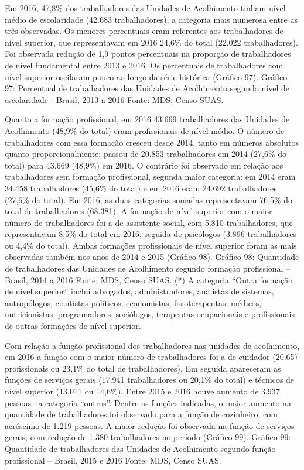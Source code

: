 \documentclass[
  brazilian]{report}
\begin{document}
Em 2016, 47,8\% dos trabalhadores das Unidades de Acolhimento tinham
nível médio de escolaridade (42.683 trabalhadores), a categoria mais
numerosa entre as três observadas. Os menores percentuais eram
referentes aos trabalhadores de nível superior, que representavam em
2016 24,6\% do total (22.022 trabalhadores). Foi observada redução de
1,9 pontos percentuais na proporção de trabalhadores de nível
fundamental entre 2013 e 2016. Os percentuais de trabalhadores com nível
superior oscilaram pouco ao longo da série histórica (Gráfico 97).
Gráfico 97: Percentual de trabalhadores das Unidades de Acolhimento
segundo nível de escolaridade - Brasil, 2013 a 2016 Fonte: MDS, Censo
SUAS.

Quanto a formação profissional, em 2016 43.669 trabalhadores das
Unidades de Acolhimento (48,9\% do total) eram profissionais de nível
médio. O número de trabalhadores com essa formação cresceu desde 2014,
tanto em números absolutos quanto proporcionalmente: passou de 20.853
trabalhadores em 2014 (27,6\% do total) para 43.669 (48,9\%) em 2016. O
contrário foi observado em relação aos trabalhadores sem formação
profissional, segunda maior categoria: em 2014 eram 34.458 trabalhadores
(45,6\% do total) e em 2016 eram 24.692 trabalhadores (27,6\% do total).
Em 2016, as duas categorias somadas representavam 76,5\% do total de
trabalhadores (68.381). A formação de nível superior com o maior número
de trabalhadores foi a de assistente social, com 5.810 trabalhadores,
que representavam 8,5\% do total em 2016, seguida de psicólogos (3.896
trabalhadores ou 4,4\% do total). Ambas formações profissionais de nível
superior foram as mais observadas também nos anos de 2014 e 2015
(Gráfico 98). Gráfico 98: Quantidade de trabalhadores das Unidades de
Acolhimento segundo formação profissional -- Brasil, 2014 a 2016 Fonte:
MDS, Censo SUAS. (*) A categoria ``Outra formação de nível superior''
inclui advogados, administradores, analistas de sistemas, antropólogos,
cientistas políticos, economistas, fisioterapeutas, médicos,
nutricionistas, programadores, sociólogos, terapeutas ocupacionais e
profissionais de outras formações de nível superior.

Com relação a função profissional dos trabalhadores nas unidades de
acolhimento, em 2016 a função com o maior número de trabalhadores foi a
de cuidador (20.657 profissionais ou 23,1\% do total de trabalhadores).
Em seguida apareceram as funções de serviços gerais (17.941
trabalhadores ou 20,1\% do total) e técnicos de nível superior (13.011
ou 14,6\%). Entre 2015 e 2016 houve aumento de 3.937 pessoas na
categoria ``outros''. Dentre as funções indicadas, o maior aumento na
quantidade de trabalhadores foi observado para a função de cozinheiro,
com acréscimo de 1.219 pessoas. A maior redução foi observada na função
de serviços gerais, com redução de 1.380 trabalhadores no período
(Gráfico 99). Gráfico 99: Quantidade de trabalhadores das Unidades de
Acolhimento segundo função profissional -- Brasil, 2015 e 2016 Fonte:
MDS, Censo SUAS.
\end{document}
